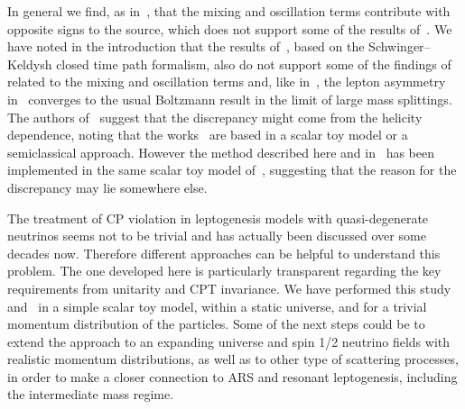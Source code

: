\documentclass[11pt,a4paper]{article}
\begin{document}
In general we find, as in~\cite{Racker20}, that the mixing and oscillation terms contribute with opposite signs to the source, which does not support some of the results of~\cite{Dev:2014laa, Dev:2015wpa, Dev:2014wsa, Kartavtsev15}. We have noted in the introduction that the results of~\cite{Jukkala:2021cys}, based on the Schwinger–Keldysh closed time path formalism, also do not support some of the findings of~\cite{Dev:2014laa, Dev:2015wpa, Dev:2014wsa, Kartavtsev15} related to the mixing and oscillation terms and, like in~\cite{Racker20}, the lepton asymmetry in~\cite{Jukkala:2021cys} converges to the usual Boltzmann result in the limit of large mass splittings. The authors of~\cite{Jukkala:2021cys} suggest that the discrepancy might come from the helicity dependence, noting that the works~\cite{Dev:2014laa, Dev:2015wpa, Dev:2014wsa, Kartavtsev15} are based in a  scalar toy model or a semiclassical approach. However the method described here and in~\cite{Racker20} has been implemented in the same scalar toy model of~\cite{Dev:2014wsa, Kartavtsev15}, suggesting that the reason for the discrepancy may lie somewhere else. 


The treatment of CP violation in leptogenesis models with quasi-degenerate neutrinos seems not to be trivial and has actually been discussed over some decades now. Therefore different approaches can be helpful to understand this problem. The one developed here is particularly transparent regarding the key requirements from unitarity and CPT invariance. 
We have performed this study and~\cite{Racker20} in a simple scalar toy model, within a static universe, and for a trivial momentum distribution of the particles. Some of the next steps could be to extend the approach to an expanding universe and spin 1/2 neutrino fields with realistic momentum distributions, as well as to other type of scattering processes, in order to make a closer connection to ARS and resonant leptogenesis, including the intermediate mass regime.  





\end{document}
